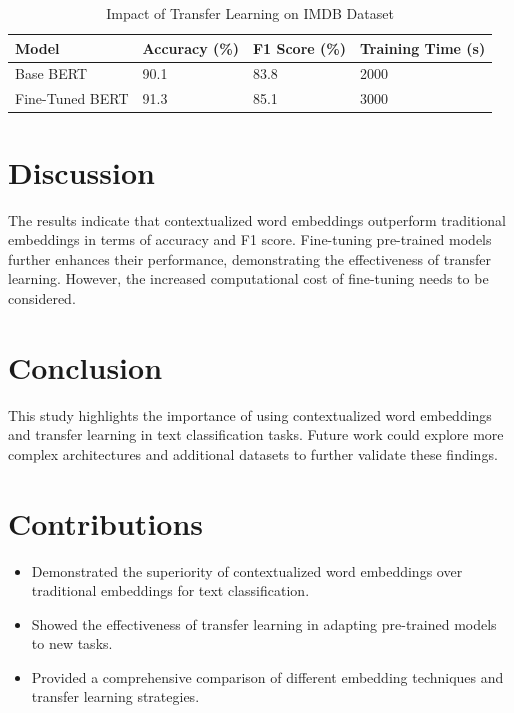 \documentclass{article}
\begin{document}
\begin{table}[ht]
\centering
\caption{Impact of Transfer Learning on IMDB Dataset}
\label{tab:transfer_learning}
\begin{tabular}{@{}llll@{}}
\toprule
Model & Accuracy (\%) & F1 Score (\%) & Training Time (s) \\ \midrule
Base BERT & 90.1 & 83.8 & 2000 \\
Fine-Tuned BERT & 91.3 & 85.1 & 3000 \\ \bottomrule
\end{tabular}
\end{table}

\section{Discussion}
The results indicate that contextualized word embeddings outperform traditional embeddings in terms of accuracy and F1 score. Fine-tuning pre-trained models further enhances their performance, demonstrating the effectiveness of transfer learning. However, the increased computational cost of fine-tuning needs to be considered.

\section{Conclusion}
This study highlights the importance of using contextualized word embeddings and transfer learning in text classification tasks. Future work could explore more complex architectures and additional datasets to further validate these findings.

\section{Contributions}
\begin{itemize}
    \item Demonstrated the superiority of contextualized word embeddings over traditional embeddings for text classification.
    \item Showed the effectiveness of transfer learning in adapting pre-trained models to new tasks.
    \item Provided a comprehensive comparison of different embedding techniques and transfer learning strategies.
\end{itemize}



\end{document}
